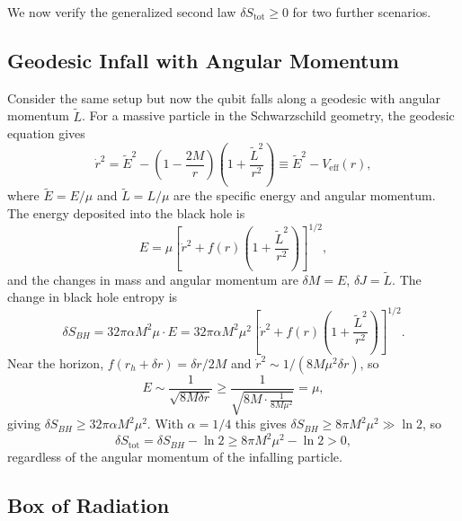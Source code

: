 We now verify the generalized second law $\delta S_{\text{tot}} \geq 0$
for two further scenarios.

\subsection*{Geodesic Infall with Angular Momentum}

Consider the same setup but now the qubit falls along a geodesic with
angular momentum $\tilde L$. For a massive particle in the Schwarzschild
geometry, the geodesic equation gives
\begin{equation}
	\dot r^2 = \tilde E^2
	- \left(1-\frac{2M}{r}\right)
	\left(1+\frac{\tilde L^2}{r^2}\right)
	\equiv \tilde E^2 - V_{\text{eff}}(r),
\end{equation}
where $\tilde E = E/\mu$ and $\tilde L = L/\mu$ are the specific energy
and angular momentum. The energy deposited into the black hole is
\begin{equation}
	E = \mu\left[\dot r^2
		+ f(r)\left(1+\frac{\tilde L^2}{r^2}\right)\right]^{1/2},
\end{equation}
and the changes in mass and angular momentum are $\delta M = E$,
$\delta J = \tilde L$. The change in black hole entropy is
\begin{equation}
	\delta S_{BH} = 32\pi\alpha M^2\mu\cdot E
	= 32\pi\alpha M^2\mu^2
	\left[\dot r^2 + f(r)\left(1+\frac{\tilde L^2}{r^2}\right)
		\right]^{1/2}.
\end{equation}
Near the horizon, $f(r_h+\delta r) = \delta r/2M$ and
$\dot r^2\sim 1/(8M\mu^2\delta r)$, so
\begin{equation}
	E\sim\frac{1}{\sqrt{8M\delta r}}
	\geq \frac{1}{\sqrt{8M\cdot\frac{1}{8M\mu^2}}}
	= \mu,
\end{equation}
giving $\delta S_{BH} \geq 32\pi\alpha M^2\mu^2$. With $\alpha = 1/4$
this gives $\delta S_{BH} \geq 8\pi M^2\mu^2 \gg \ln 2$, so
\begin{equation}
	\delta S_{\text{tot}}
	= \delta S_{BH} - \ln 2
	\geq 8\pi M^2\mu^2 - \ln 2 > 0,
\end{equation}
regardless of the angular momentum of the infalling particle.

\subsection*{Box of Radiation}

